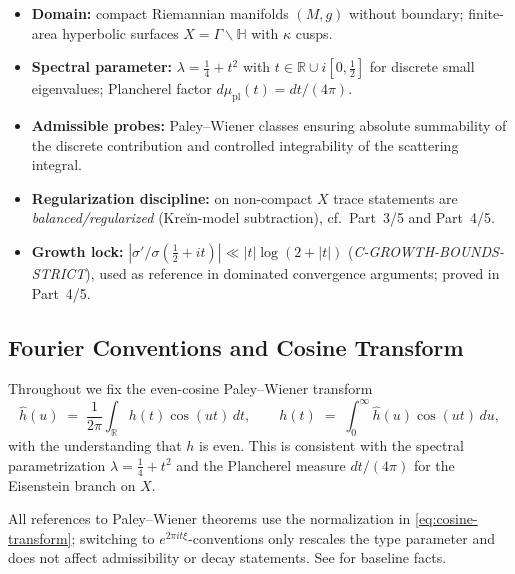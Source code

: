 \begin{tcolorbox}[colback=gray!4,colframe=gray!60,title={Scope \& Invariants for Part~2/5}] %
\begin{itemize}
  \item \textbf{Domain:} compact Riemannian manifolds $(M,g)$ without boundary; finite-area hyperbolic surfaces $X=\Gamma\backslash\mathbb H$ with $\kappa$ cusps. %
  \item \textbf{Spectral parameter:} $\lambda=\tfrac14+t^2$ with $t\in\mathbb R\cup i[0,\tfrac12]$ for discrete small eigenvalues; Plancherel factor $d\mu_{\mathrm{pl}}(t)=dt/(4\pi)$. %
  \item \textbf{Admissible probes:} Paley–Wiener classes ensuring absolute summability of the discrete contribution and controlled integrability of the scattering integral. %
  \item \textbf{Regularization discipline:} on non-compact $X$ trace statements are \emph{balanced/regularized} (Kreĭn-model subtraction), cf.\ Part~3/5 and Part~4/5. %
  \item \textbf{Growth lock:} $|\sigma'/\sigma(\tfrac12+it)|\ll |t|\log(2+|t|)$ (\emph{C-GROWTH-BOUNDS-STRICT}), used as reference in dominated convergence arguments; proved in Part~4/5. %
\end{itemize}
\end{tcolorbox} %

\subsection{Fourier Conventions and Cosine Transform} \label{subsec:fourier-conv} \relax \hspace{0pt} %

Throughout we fix the even-cosine Paley–Wiener transform
\begin{equation}\label{eq:cosine-transform}
  \widehat{h}(u) \;=\; \frac{1}{2\pi}\int_{\mathbb R} h(t)\cos(ut)\,dt, 
  \qquad
  h(t) \;=\; \int_{0}^{\infty} \widehat{h}(u)\cos(ut)\,du, %
\end{equation}
with the understanding that $h$ is even. This is consistent with the spectral parametrization $\lambda=\tfrac14+t^2$ and the Plancherel measure $dt/(4\pi)$ for the Eisenstein branch on $X$. %

\begin{remark} %
All references to Paley–Wiener theorems use the normalization in \eqref{eq:cosine-transform}; switching to $e^{2\pi i t\xi}$-conventions only rescales the type parameter and does not affect admissibility or decay statements. See \cite{PaleyWiener1934, HormanderI} for baseline facts. %
\end{remark}

